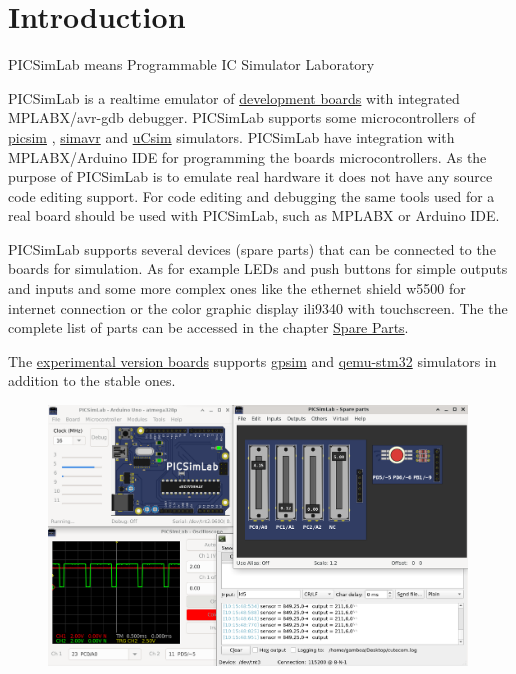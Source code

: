 \chapter{Introduction}


PICSimLab means Programmable IC Simulator Laboratory

PICSimLab is a realtime emulator of \hyperlink{def:boards}{development boards} with integrated 
MPLABX/avr-gdb debugger. 
PICSimLab supports some microcontrollers of \href{https://github.com/lcgamboa/picsim}{picsim} , 
\href{https://github.com/buserror/simavr}{simavr} and
\href{http://mazsola.iit.uni-miskolc.hu/\%7edrdani/embedded/ucsim/}{uCsim} simulators.
PICSimLab have integration with MPLABX/Arduino IDE for programming the boards microcontrollers.
As the purpose of PICSimLab is to emulate real hardware it does not have any source code editing support.
For code editing and debugging the same tools used for a real board should be used with PICSimLab, such as MPLABX or Arduino IDE. 

PICSimLab supports several devices (spare parts) that can be connected to the boards for simulation. 
As for example LEDs and push buttons for simple outputs and inputs and some more complex ones like the ethernet 
shield w5500 for internet connection or the color graphic display ili9340 with touchscreen. 
The the complete list of parts can be accessed in the chapter \hyperlink{def:spare}{Spare Parts}. 

The \hyperlink{def:eboards}{experimental version boards} supports 
\href{http://gpsim.sourceforge.net/}{gpsim} and \href{http://beckus.github.io/qemu_stm32/}{qemu-stm32} simulators
in addition to the stable ones.


\begin{figure}[H]
\center
\includegraphics[width=0.99\textwidth]{img/screenshot.png} 
\end{figure} 

